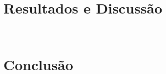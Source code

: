 \documentclass[12pt]{article}
\begin{document}
\section{Resultados e Discussão}
\
\section{Conclusão}
\






\end{document}
